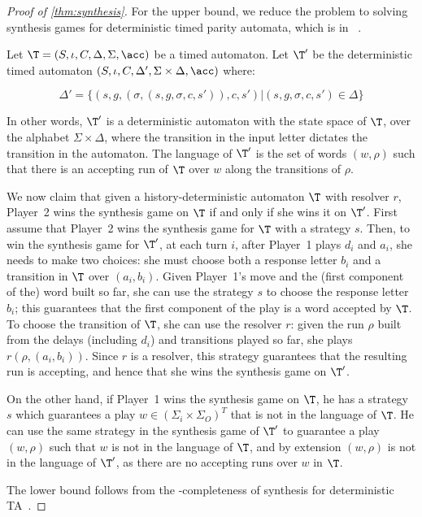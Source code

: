 \begin{proof}[Proof of \cref{thm:synthesis}]
    For the upper bound, we reduce the problem to solving synthesis games for deterministic timed parity automata, which is in \exptime~\cite{DM2002}.
 
	Let $\T=(S,\iota,C,\Delta,\Sigma,\acc)$ be a timed automaton. Let $\T'$ be the deterministic timed automaton $(S,\iota,C,\Delta',\Sigma\times \Delta, \acc)$ where:
	
	
	$$\Delta' = \{(s,g,(\sigma,(s,g,\sigma,c,s')),c,s')| (s,g,\sigma,c,s')\in \Delta\}$$
	
	In other words, $\T'$ is a deterministic automaton with the state space of $\T$, over the alphabet $\Sigma\times \Delta$, where the transition in the input letter dictates the transition in the automaton. The language of $\T'$ is the set of words $(w,\rho)$ such that there is an accepting run of $\T$ over $w$ along the transitions of $\rho$.
	
	We now claim that given a history-deterministic automaton $\T$ with resolver $r$, Player~2 wins the synthesis game on $\T$ if and only if she wins it on $\T'$.
	First assume that Player~2 wins the synthesis game for $\T$ with a strategy $s$. Then, to win the synthesis game for $\T'$, at each turn $i$, after Player~1 plays $d_i$ and $a_i$, she needs to make two choices: she must choose both a response letter $b_i$ and a transition in $\T$ over $(a_i,b_i)$. Given Player~1's move and the (first component of the) word built so far, she can use the strategy $s$ to choose the response letter $b_i$; this guarantees that the first component of the play is a word accepted by $\T$. To choose the transition of $\T$, she can use the resolver $r$: given the run $\rho$ built from the delays (including $d_i$) and transitions played so far, she plays $r(\rho,(a_i,b_i))$. Since $r$ is a resolver, this strategy guarantees that the resulting run is accepting, and hence that she wins the synthesis game on $\T'$.
	
	On the other hand, if Player~1 wins the synthesis game on $\T$, he has a strategy $s$ which guarantees a play $w\in (\Sigma_i\times \Sigma_O)^T$ that is not in the language of $\T$. He can use the same strategy in the synthesis game of $\T'$ to guarantee a play $(w,\rho)$ such that $w$ is not in the language of $\T$, and by extension $(w,\rho)$ is not in the language of $\T'$, as there are no accepting runs over $w$ in $\T$.
	
	The lower bound follows from the \exptime-completeness of synthesis for deterministic TA~\cite{DM2002}.
\end{proof}

